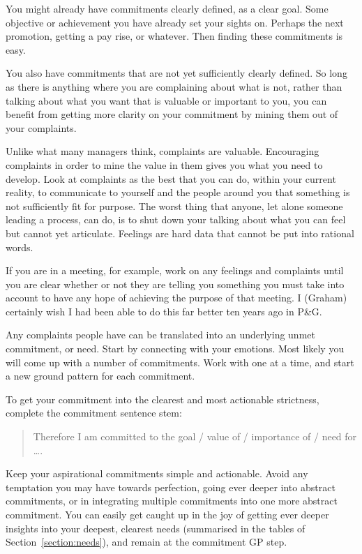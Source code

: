 You might already have commitments clearly defined, as a clear goal. Some objective or achievement you have already set your sights on. Perhaps the next promotion, getting a pay rise, or whatever. Then finding these commitments is easy. 


You also have commitments that are not yet sufficiently clearly defined. So long as there is anything where you are complaining about what is not, rather than talking about what you want that is valuable or important to you, you can benefit from getting more clarity on your commitment by mining them out of your complaints. 


Unlike what many managers think, complaints are valuable. Encouraging complaints in order to mine the value in them gives you what you need to develop. Look at complaints as the best that you can do, within your current reality, to communicate to yourself and the people around you that something is not sufficiently fit for purpose. The worst thing that anyone, let alone someone leading a process, can do, is to shut down your talking about what you can feel but cannot yet articulate. Feelings are hard data that cannot be put into rational words. 


If you are in a meeting, for example, work on any feelings and complaints until you are clear whether or not they are telling you something you must take into account to have any hope of achieving the purpose of that meeting. I (Graham) certainly wish I had been able to do this far better ten years ago in P\&G.
 
Any complaints people have can be translated into an underlying unmet commitment, or need. Start by connecting with your emotions. Most likely you will come up with a number of commitments. Work with one at a time, and start a new ground pattern for each commitment.


To get your commitment into the clearest and most actionable strictness, complete the commitment sentence stem:


\begin{quote}
Therefore I am committed to the goal / value of / importance of / need for \ldots .
\end{quote}


Keep your aspirational commitments simple and actionable. Avoid any temptation you may have towards perfection, going ever deeper into abstract commitments, or in integrating multiple commitments into one more abstract commitment. You can easily get caught up in the joy of getting ever deeper insights into your deepest, clearest needs (summarised in the tables of Section~\ref{section:needs}), and remain at the commitment GP step. 


